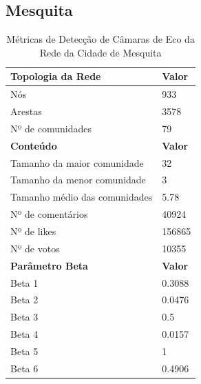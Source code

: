 \subsection{Mesquita}

\begin{table}[ht]
	\centering
	\caption{Métricas de Detecção de Câmaras de Eco da Rede da Cidade de Mesquita}
	\label{tab:echo-chamber-metrics-mesquita}
	\begin{tabular}{l|l}
		\toprule
		\textbf{Topologia da Rede}          & \textbf{Valor}                   \\
		\midrule
		Nós                                 & 933                              \\
		Arestas                             & 3578                             \\
		Nº de comunidades                   & 79                               \\
		\toprule
		\textbf{Conteúdo}                   & \textbf{Valor}                   \\
		\midrule
		Tamanho da maior comunidade         & 32                               \\
		Tamanho da menor comunidade         & 3                                \\
		Tamanho médio das comunidades       & 5.78                             \\
		Nº de comentários                   & 40924                            \\
		Nº de likes                         & 156865                           \\
		Nº de votos                         & 10355                            \\
		\midrule
		\textbf{Parâmetro Beta}             & \textbf{Valor}                   \\
		\midrule
		Beta 1                              & 0.3088                           \\
		Beta 2                              & 0.0476                           \\
		Beta 3                              & 0.5                              \\
		Beta 4                              & 0.0157                           \\
		Beta 5                              & 1                                \\
		Beta 6                              & 0.4906                           \\

\end{tabular}
\end{table}
